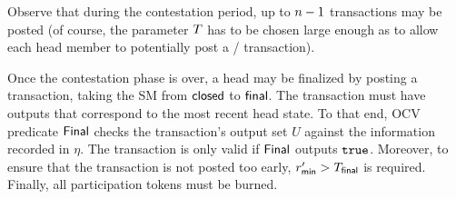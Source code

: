 Observe that during the contestation period, up to $n-1$
\mtxContest{} transactions may be posted (of course, the parameter
$T$ has to be chosen large enough as to allow each head member to
potentially post a \mtxClose{}/\mtxContest{} transaction).






  Once the contestation phase is over, a head
may be finalized by posting a \mtxFanout{} transaction, taking the SM
from $\mathsf{closed}$ to $\mathsf{final}$.  The \mtxFanout{} transaction must
have outputs that correspond to the most recent head state.  To that
end, OCV predicate $\mathsf{Final}$ checks the transaction's output set $U$
against the information recorded in $\eta$.  The \mtxFanout{}
transaction is only valid if $\mathsf{Final}$ outputs $\mathtt{true}$.  Moreover,
to ensure that the \mtxFanout{} transaction is not posted too early,
$r_{\mathsf{min}}' > T_{\mathsf{final}}$ is required.  Finally, all participation tokens
must be burned.


